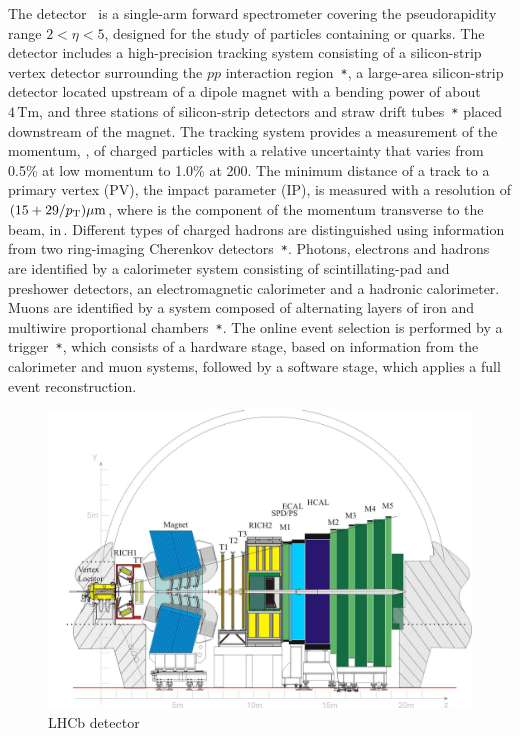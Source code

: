 The \lhcb detector~\cite{Alves:2008zz,LHCb-DP-2014-002} is a single-arm forward
spectrometer covering the \mbox{pseudorapidity} range $2<\eta <5$,
designed for the study of particles containing \bquark or \cquark
quarks. The detector includes a high-precision tracking system
consisting of a silicon-strip vertex detector surrounding the $pp$
interaction region~\cite{LHCb-DP-2014-001}\verb!*!, a large-area silicon-strip detector located
upstream of a dipole magnet with a bending power of about
$4{\mathrm{\,Tm}}$, and three stations of silicon-strip detectors and straw
drift tubes~\cite{LHCb-DP-2013-003}\verb!*! placed downstream of the magnet.
The tracking system provides a measurement of the momentum, \ptot, of charged particles with
a relative uncertainty that varies from 0.5\% at low momentum to 1.0\% at 200\gevc.
The minimum distance of a track to a primary vertex (PV), the impact parameter (IP),
is measured with a resolution of $(15+29/\mbox{$p_{\rm T}$})\rm \mu m$,
where \pt is the component of the momentum transverse to the beam, in\,\gevc.
Different types of charged hadrons are distinguished using information
from two ring-imaging Cherenkov detectors~\cite{LHCb-DP-2012-003}\verb!*!.
Photons, electrons and hadrons are identified by a calorimeter system consisting of
scintillating-pad and preshower detectors, an electromagnetic
calorimeter and a hadronic calorimeter. Muons are identified by a
system composed of alternating layers of iron and multiwire
proportional chambers~\cite{LHCb-DP-2012-002}\verb!*!.
The online event selection is performed by a trigger~\cite{LHCb-DP-2012-004}\verb!*!,
which consists of a hardware stage, based on information from the calorimeter and muon
systems, followed by a software stage, which applies a full event
reconstruction.


\begin{figure} [htb!]
\begin{center}
\includegraphics[scale=0.2]{figs/lhcb-slide.jpg}
\caption{LHCb detector \label{fig:LHCb}}
\end{center}
\end{figure}

